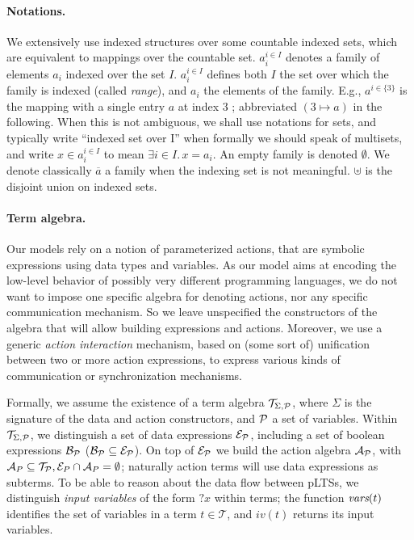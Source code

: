 \documentclass{lncs/llncs}
\def\AlgT{\mathcal{T}}
\begin{document}
\paragraph*{Notations.}
We extensively use indexed structures
over some countable indexed sets, which are equivalent to mappings over
the countable set. %
$a_i^{i\in I}$
denotes a family of elements $a_i$ indexed over the
set $I$. %
$a_i^{i\in I}$ defines both $I$ the set over which the family is
indexed (called \emph{range}), and $a_i$ the elements of the family.
E.g., $a^{i\in\{3\}}$ is the mapping with a single entry $a$ at index
$3$ ; abbreviated $(3\mapsto a)$ in the following.
When this is not
ambiguous, we shall use notations for sets, and typically write
``indexed set over I'' when formally we should speak of multisets, and
write $x\in a_i^{i\in I}$ to mean $\exists i\in I.\, x=a_i$.  An empty
family is denoted $\emptyset$. We
denote classically $\overline{a}$ a family when the indexing set is
not meaningful.  $\uplus$ is the disjoint union on
indexed sets.


\paragraph*{Term algebra.}
Our models rely on a notion of parameterized actions, that are
symbolic expressions using data types and variables. As our model aims
at encoding the low-level behavior of possibly very different
programming languages, we do not want to impose one specific algebra
for denoting actions, nor any specific communication mechanism. So we
leave unspecified the constructors of the algebra that will allow building
expressions and actions. Moreover, we use a generic {\em action interaction}
mechanism, based on (some sort of) unification between two or more action
expressions, to express various kinds of communication or
synchronization mechanisms.

\def\Talg{\mathcal{T}_{\Sigma,\P}}
Formally, we assume the existence of a term algebra $\Talg$,
where $\Sigma$ is the signature of the data and action constructors,
and $\P$ a set of variables. Within $\Talg$, we distinguish a set of
data expressions $\mathcal{E}_\P$, including a set of boolean
expressions $\mathcal{B}_{\P}$ ($\mathcal{B}_{\P}\subseteq\mathcal{E}_\P$).
On top of $\mathcal{E}_\P$ we build the action algebra
$\mathcal{A}_\P$, with $\mathcal{A}_P\subseteq\mathcal{T}_\P,
\mathcal{E}_P\cap\mathcal{A}_P=\emptyset$;
naturally action terms will use data expressions as subterms.
To be able to reason about the data flow between pLTSs, we
distinguish \emph{input variables} of the form $?x$ within terms; the function
$\vars(t)$ identifies the set of variables in a term
$t\in\AlgT$, and $iv(t)$ returns its input variables.
\end{document}
